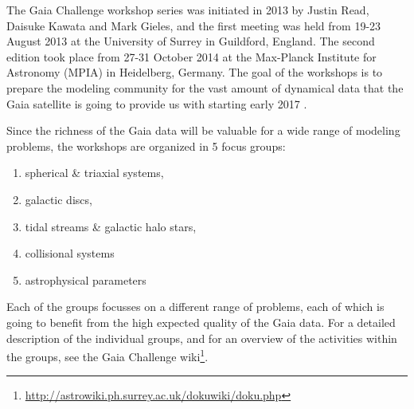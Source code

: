 The Gaia Challenge workshop series was initiated in 2013 by Justin Read, Daisuke Kawata and Mark Gieles, and the first meeting was held from 19-23 August 2013 at the University of Surrey in Guildford, England. 
The second edition took place from 27-31 October 2014 at the Max-Planck Institute for Astronomy (MPIA) in Heidelberg, Germany. 
The goal of the workshops is to prepare the modeling community for the vast amount of dynamical data that the Gaia satellite is going to provide us with starting early 2017 \citep{Perryman01}.

Since the richness of the Gaia data will be valuable for a wide range of modeling problems, the workshops are organized in 5 focus groups:
\begin{enumerate}
\item spherical \& triaxial systems,
\item galactic discs,
\item tidal streams \& galactic halo stars,
\item collisional systems
\item astrophysical parameters 
\end{enumerate}
Each of the groups focusses on a different range of problems, each of which is going to benefit from the high expected quality of the Gaia data. For a detailed description of the individual groups, and for an overview of the activities within the groups, see the Gaia Challenge wiki\footnote{\url{http://astrowiki.ph.surrey.ac.uk/dokuwiki/doku.php}}.